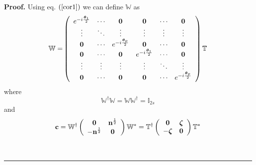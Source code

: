 \documentclass[aps,preprint]{revtex4}%
\newenvironment{proof}[1][Proof]{\noindent\textbf{#1.} }{\ \rule{0.5em}{0.5em}}
\begin{document}
\begin{proof}
Using eq. $\left(  \ref{cor1}\right)  $ we can define $\mathbb{W}$ as%
\begin{equation}
\mathbb{W=}\left(
\begin{array}
[c]{cccccc}%
e^{-i\frac{\boldsymbol{\theta}_{1}}{2}} & \mathbf{\cdots} & \mathbf{0} &
\mathbf{0} & \mathbf{\cdots} & \mathbf{0}\\
\mathbf{\vdots} & \mathbf{\ddots} & \mathbf{\vdots} & \mathbf{\vdots} &
\mathbf{\vdots} & \mathbf{\vdots}\\
\mathbf{0} & \mathbf{\cdots} & e^{-i\frac{\boldsymbol{\theta}_{p}}{2}} &
\mathbf{0} & \mathbf{\cdots} & \mathbf{0}\\
\mathbf{0} & \mathbf{\cdots} & \mathbf{0} & e^{-i\frac{\boldsymbol{\theta}_{1}%
}{2}} & \mathbf{\cdots} & \mathbf{0}\\
\mathbf{\vdots} & \mathbf{\vdots} & \mathbf{\vdots} & \mathbf{\vdots} &
\mathbf{\ddots} & \mathbf{\vdots}\\
\mathbf{0} & \mathbf{\cdots} & \mathbf{0} & \mathbf{0} & \mathbf{\cdots} &
e^{-i\frac{\boldsymbol{\theta}_{p}}{2}}%
\end{array}
\right)  \mathbb{T}%
\end{equation}
where
\begin{equation}
\mathbb{W}^{\dagger}\mathbb{W=WW}^{\dagger}\mathbb{=I}_{2s}%
\end{equation}
and
\begin{equation}
\mathbf{c}=\mathbb{W}^{\dagger}\left(
\begin{array}
[c]{cc}%
\mathbf{0} & \mathbf{n}^{\frac{1}{2}}\\
-\mathbf{n}^{\frac{1}{2}} & \mathbf{0}%
\end{array}
\right)  \mathbb{W}^{\ast}=\mathbb{T}^{\dagger}\left(
\begin{array}
[c]{cc}%
\mathbf{0} & \boldsymbol{\zeta}\\
-\boldsymbol{\zeta} & \mathbf{0}%
\end{array}
\right)  \mathbb{T}^{\ast}\label{cex}%
\end{equation}

\end{proof}
\end{document}
